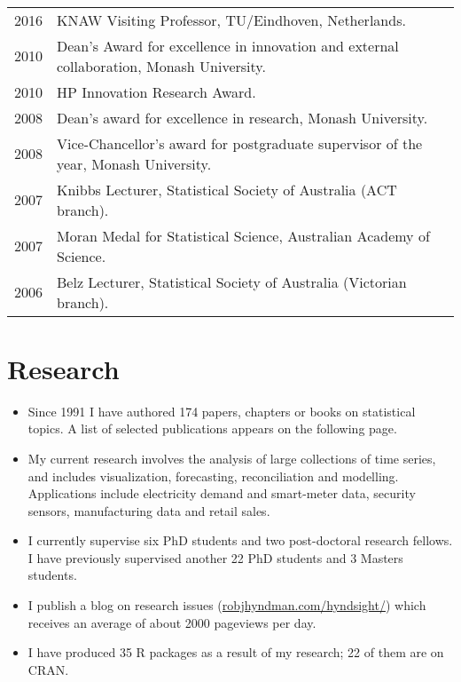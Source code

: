 \documentclass[a4paper,10pt]{article}
\begin{document}
~\begin{tabular}{ll}
2016 & KNAW Visiting Professor, TU/Eindhoven, Netherlands.\\
2010 & Dean's Award for excellence in innovation and external collaboration, Monash University.\\
2010 & HP Innovation Research Award.\\
2008 & Dean's award for excellence in research, Monash University.\\
2008 & Vice-Chancellor's award for postgraduate supervisor of the year, Monash University.\\
2007 & Knibbs Lecturer, Statistical Society of Australia (ACT branch).\\
2007 & Moran Medal for Statistical Science, Australian Academy of Science.\\
2006 & Belz Lecturer, Statistical Society of Australia (Victorian branch).
\end{tabular}

\section{Research}

\begin{itemize}\parskip=0cm
\item Since 1991 I have authored 174 papers, chapters or books on statistical topics. A list of selected publications appears on the following page.
\item  My current research involves the analysis of large collections of time series, and includes visualization, forecasting, reconciliation and modelling. Applications include electricity demand and smart-meter data, security sensors, manufacturing data and retail sales.
\item I currently supervise six PhD students and two post-doctoral research fellows. I have previously supervised another 22 PhD students and 3 Masters students.
\item I publish a blog on research issues (\url{robjhyndman.com/hyndsight/}) which receives an average of about 2000 pageviews per day.
\item I have produced 35 R packages as a result of my research; 22 of them are on CRAN.
\end{itemize}
\end{document}
